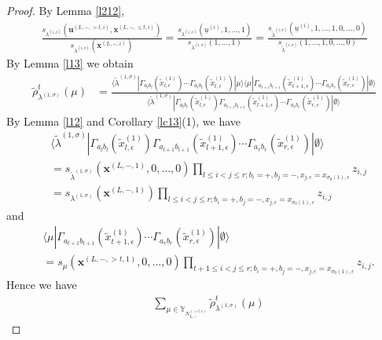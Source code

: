 \documentclass[10pt,a4paper]{amsart}
\newcommand\YY{\mathbb{Y}}
\newcommand\si{\sigma}
\begin{document}
\begin{proof}By Lemma \ref{l212}, 
\begin{align*}
\frac{s_{\lambda^{(i,\sigma)}}\left(\mathbf{u}^{(L,-,>t,i)},\mathbf{x}^{(L,-,\leq t,i)}\right)}{s_{\lambda^{(i,\sigma)}}\left(\mathbf{x}^{(L,-,i)}\right)}=\frac{s_{\lambda^{(i,\sigma)}}\left(\underline{u}^{(i)},1,\ldots,1\right)}{s_{\lambda^{(i,\sigma)}}\left(1,\ldots,1\right)}=\frac{s_{\tilde{\lambda}^{(i,\sigma)}}\left(\underline{u}^{(i)},1,\ldots,1,0,\ldots,0\right)}{s_{\tilde{\lambda}^{(i,\sigma)}}\left(1,\ldots,1,0,\ldots,0\right)}
\end{align*}
By Lemma \ref{l13} we obtain
\begin{align*}
\tilde{\rho}^t_{\lambda^{(1,\si)}}(\mu)&=\frac{\langle\tilde{\lambda}^{(1,\sigma)}| \Gamma_{a_lb_l}(\tilde{x}_{l,\epsilon}^{(1)})\cdots \Gamma_{a_{t}b_{t}}(\tilde{x}_{t,\epsilon}^{(1)})|\mu \rangle
\langle\mu| \Gamma_{a_{t+1}b_{t+1}}(\tilde{x}_{t+1,\epsilon}^{(1)})\cdots \Gamma_{a_{r}b_{r}}(\tilde{x}_{r,\epsilon}^{(1)})|\emptyset \rangle}{\langle\tilde{\lambda}^{(1,\sigma)}| \Gamma_{a_lb_l}(\tilde{x}_{l,\epsilon}^{(1)})\Gamma_{a_{l+1}b_{l+1}}(\tilde{x}_{l+1,\epsilon}^{(1)})\cdots \Gamma_{a_rb_r}(\tilde{x}_{r,\epsilon}^{(1)})|\emptyset \rangle}
\end{align*}
By Lemma \ref{l12} and Corollary \ref{lc13}(1), we have 
\begin{align*}
&\langle\tilde{\lambda}^{(1,\sigma)}| \Gamma_{a_lb_l}(\tilde{x}_{l,\epsilon}^{(1)})\Gamma_{a_{l+1}b_{l+1}}(\tilde{x}_{l+1,\epsilon}^{(1)})\cdots \Gamma_{a_rb_r}(\tilde{x}_{r,\epsilon}^{(1)})|\emptyset \rangle\\
&=s_{\tilde{\lambda}^{(1,\si)}}\left(\mathbf{x}^{(L,-,1)},0,\ldots,0\right)\prod_{l\leq i<j\leq r;b_i=+,b_j=-,x_{j,\epsilon}=x_{\sigma_0(1),\epsilon}}z_{i,j}\\
&=s_{\lambda^{(1,\si)}}\left(\mathbf{x}^{(L,-,1)}\right)\prod_{l\leq i<j\leq r;b_i=+,b_j=-,x_{j,\epsilon}=x_{\sigma_0(1),\epsilon}}z_{i,j}
\end{align*}
and
\begin{align*}
&\langle\mu| \Gamma_{a_{t+1}b_{t+1}}(\tilde{x}_{t+1,\epsilon}^{(1)})\cdots \Gamma_{a_{r}b_{r}}(\tilde{x}_{r,\epsilon}^{(1)})|\emptyset \rangle\\
&=s_{\mu}\left(\mathbf{x}^{(L,-,>t,1)},0,\ldots,0\right)\prod_{t+1\leq i<j\leq r;b_i=+,b_j=-,x_{j,\epsilon}=x_{\sigma_0(1),\epsilon}}z_{i,j}.
\end{align*}
Hence we have
\begin{align*}
&\sum_{\mu\in \YY_{N_{L,-}^{(>t,\epsilon)}}}\tilde{\rho}^t_{\lambda^{(1,\si)}}(\mu)

\end{align*}
\end{proof}
\end{document}
